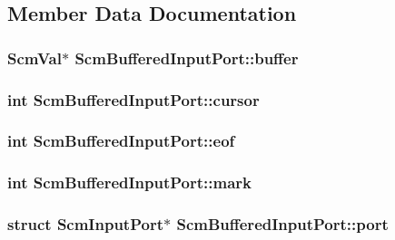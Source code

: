 \subsection{Member Data Documentation}
\hypertarget{struct_scm_buffered_input_port_af2fd325812eeb126f19574021b7fa3fe}{
\subsubsection[{buffer}]{\setlength{\rightskip}{0pt plus 5cm}Scm\-Val$\ast$ Scm\-Buffered\-Input\-Port\-::buffer}}\label{struct_scm_buffered_input_port_af2fd325812eeb126f19574021b7fa3fe}
\hypertarget{struct_scm_buffered_input_port_a0eb0cdba77d024904df08295d5664dde}{
\subsubsection[{cursor}]{\setlength{\rightskip}{0pt plus 5cm}int Scm\-Buffered\-Input\-Port\-::cursor}}\label{struct_scm_buffered_input_port_a0eb0cdba77d024904df08295d5664dde}
\hypertarget{struct_scm_buffered_input_port_a1d4062d7364c8dbdeb765db604b6fb9c}{
\subsubsection[{eof}]{\setlength{\rightskip}{0pt plus 5cm}int Scm\-Buffered\-Input\-Port\-::eof}}\label{struct_scm_buffered_input_port_a1d4062d7364c8dbdeb765db604b6fb9c}
\hypertarget{struct_scm_buffered_input_port_af2e2c7b97397b7484d1401b95215ebbe}{
\subsubsection[{mark}]{\setlength{\rightskip}{0pt plus 5cm}int Scm\-Buffered\-Input\-Port\-::mark}}\label{struct_scm_buffered_input_port_af2e2c7b97397b7484d1401b95215ebbe}
\hypertarget{struct_scm_buffered_input_port_a91762e8e9c5cde68e3689cc26e7933a5}{
\subsubsection[{port}]{\setlength{\rightskip}{0pt plus 5cm}struct Scm\-Input\-Port$\ast$ Scm\-Buffered\-Input\-Port\-::port}}\label{struct_scm_buffered_input_port_a91762e8e9c5cde68e3689cc26e7933a5}
